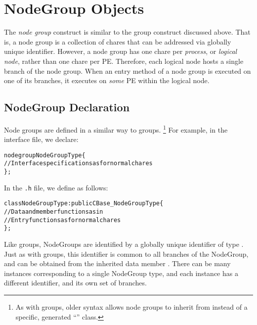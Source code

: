 \section{NodeGroup Objects}

The {\em node group} construct    is 
similar to the group construct discussed above. 
That is, a node group is a collection of chares that can be addressed via globally unique
identifier. 
However, a node group has one chare per {\em process}, or {\em logical node}, rather than one chare per PE.
Therefore, each logical node hosts a single branch of the
node group.  When an entry method of a
node group is executed on one of its branches, it executes on {\em some} PE within the logical node.

\subsection{NodeGroup Declaration} 

Node groups are defined in a similar way to groups.  \footnote{As with groups,
older syntax allows node groups to inherit from  instead of a
specific, generated ``'' class.} For example, in the interface file, we declare:

\begin{alltt}
 nodegroup NodeGroupType \{
  // Interface specifications as for normal chares
 \};
\end{alltt}

In the {\tt .h} file, we define  as follows:

\begin{alltt}
 class NodeGroupType : public CBase_NodeGroupType \{
  // Data and member functions as in \CC{}
  // Entry functions as for normal chares
 \};
\end{alltt}

Like groups, NodeGroups are identified by a globally unique identifier of type
.  Just as with groups, this identifier is
common to all branches of the NodeGroup, and can be obtained from the inherited
data member .
There can be many instances corresponding to a single NodeGroup
type, and each instance has a different identifier, and its own set of
branches.




